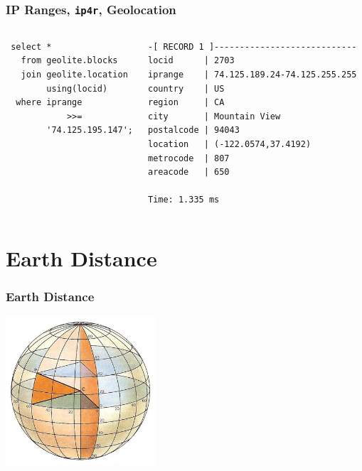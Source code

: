 \documentclass{beamer}
\begin{document}
\begin{frame}[fragile]
  \frametitle{IP Ranges, \texttt{ip4r}, Geolocation}

  \vfill

\begin{columns}
\begin{verbatim}
 select *
   from geolite.blocks
   join geolite.location
        using(locid)
  where iprange
            >>=
        '74.125.195.147';
\end{verbatim}
\begin{verbatim}
-[ RECORD 1 ]----------------------------
locid      | 2703
iprange    | 74.125.189.24-74.125.255.255
country    | US
region     | CA
city       | Mountain View
postalcode | 94043
location   | (-122.0574,37.4192)
metrocode  | 807
areacode   | 650

Time: 1.335 ms
\end{verbatim}
\end{columns}
\end{frame}

\section{Earth Distance}

\begin{frame}[fragile]
  \frametitle{Earth Distance}

\begin{center}
  \includegraphics[height=15em]{latitude_and_longitude.jpg}
\end{center}
\end{frame}
\end{document}
